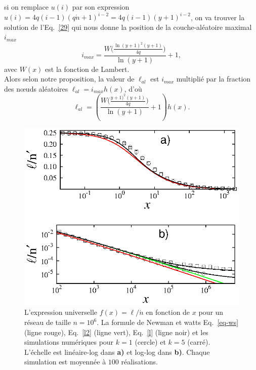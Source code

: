 si on remplace $u(i)$ par son expression $u(i)=4q(i-1)(q\acute{n}+1)^{i-2}=4q(i-1)(y+1)^{i-2}$, on va trouver la solution de l'Eq.~\eqref{29} qui nous 
donne la position de la couche-aléatoire maximal $i_{max}$ 
\begin{equation}
i_{max}=\frac{W\big(\frac{\ln(y+1)^2(y+1)}{4q}\big)}{\ln(y+1)}+1,
\end{equation}
avec $W(x)$ est la fonction de Lambert.\\
Alors selon notre proposition, la valeur de $\ell_{al}$ est $i_{max}$ multiplié par la fraction des nœuds aléatoires $\ell_{al}=i_{max}h(x)$, d'où 
\begin{equation}
\ell_{al}=(\frac{W\big(\frac{y+1)^2(y+1)}{4q}\big)}{\ln(y+1)}+1)h(x).
\label{lal}
\end{equation}
\begin{figure}[h!]
	\centering
	\includegraphics[scale=1.25,angle=0]{./figures/fig-kpn}
	\caption{L'expression universelle $f(x)=\ell/\acute{n}$ en fonction de $x$ pour un réseau de taille $n=10^6$. La formule de Newman et watts Eq.~\eqref{eq-ws} (ligne rouge), Eq.~\eqref{l2} (ligne vert), Eq.~\eqref{l} (ligne noir) et les simulations numériques pour $k=1$ (cercle) et $k=5$ (carré). L'échelle est linéaire-log dans \textbf{a)} et log-log dans \textbf{b)}. Chaque simulation est moyennée à $100$ réalisations.}
	\label{chemin}
\end{figure}

